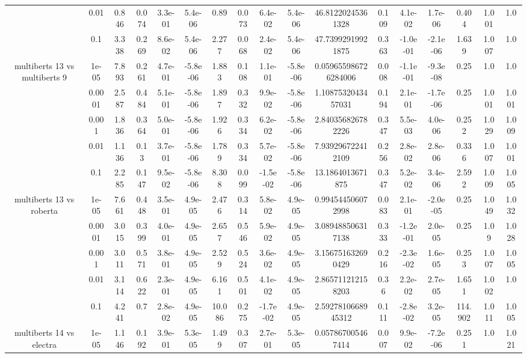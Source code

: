 \begin{tabular}{|c|c|c|c|c|c|c|c|c|c|c|c|c|c|c|c|c|}
 & 0.01 & 0.846 & 0.074 & 3.3e-01 & 5.4e-06 & 0.89 & 0.073 & 6.4e-02 & 5.4e-06 & 46.81220245361328 & 0.109 & 4.1e-02 & 1.7e-06 & 0.404 & 1.001 & 1.0 \\
 & 0.1 & 3.338 & 0.269 & 8.6e-02 & 5.4e-06 & 2.277 & 0.068 & 2.4e-02 & 5.4e-06 & 47.73992919921875 & 0.363 & -1.0e-01 & -2.1e-06 & 1.639 & 1.007 & 1.0 \\
\hline
\multirow{5}{*}{multiberts 13 vs multiberts 9} & 1e-05 & 7.893 & 0.261 & 4.7e-01 & -5.8e-06 & 1.883 & 0.108 & 1.1e-01 & -5.8e-06 & 0.059655986726284006 & 0.008 & -1.1e-01 & -9.3e-08 & 0.25 & 1.0 & 1.0 \\
 & 0.0001 & 2.587 & 0.484 & 5.1e-01 & -5.8e-06 & 1.897 & 0.332 & 9.9e-02 & -5.8e-06 & 1.1087532043457031 & 0.194 & 2.1e-01 & -1.7e-06 & 0.25 & 1.001 & 1.001 \\
 & 0.001 & 1.836 & 0.364 & 5.0e-01 & -5.8e-06 & 1.926 & 0.334 & 6.2e-02 & -5.8e-06 & 2.840356826782226 & 0.347 & 5.5e-03 & 4.0e-06 & 0.252 & 1.029 & 1.009 \\
 & 0.01 & 1.136 & 0.13 & 3.7e-01 & -5.8e-06 & 1.789 & 0.334 & 5.7e-02 & -5.8e-06 & 7.939296722412109 & 0.256 & 2.8e-02 & 2.8e-06 & 0.336 & 1.007 & 1.001 \\
 & 0.1 & 2.285 & 0.147 & 9.5e-02 & -5.8e-06 & 8.308 & 0.099 & -1.5e-02 & -5.8e-06 & 13.1864013671875 & 0.347 & 5.2e-02 & 3.4e-06 & 2.592 & 1.009 & 1.005 \\
\hline
\multirow{5}{*}{multiberts 13 vs roberta } & 1e-05 & 7.661 & 0.448 & 3.5e-01 & 4.9e-05 & 2.476 & 0.314 & 5.8e-02 & 4.9e-05 & 0.994544506072998 & 0.083 & 2.1e-01 & -2.0e-05 & 0.25 & 1.049 & 1.032 \\
 & 0.0001 & 3.015 & 0.399 & 4.0e-01 & 4.9e-05 & 2.657 & 0.546 & 5.9e-02 & 4.9e-05 & 3.089488506317138 & 0.333 & -1.2e-01 & 2.0e-05 & 0.25 & 1.09 & 1.028 \\
 & 0.001 & 3.011 & 0.571 & 3.8e-01 & 4.9e-05 & 2.529 & 0.524 & 3.6e-02 & 4.9e-05 & 3.156751632690429 & 0.216 & -2.3e-02 & 1.6e-05 & 0.253 & 1.007 & 1.005 \\
 & 0.01 & 3.114 & 0.622 & 2.3e-01 & 4.9e-05 & 6.161 & 0.501 & 4.1e-02 & 4.9e-05 & 2.865711212158203 & 0.36 & 2.2e-02 & 2.7e-05 & 1.651 & 1.002 & 1.0 \\
 & 0.1 & 4.241 & 0.7 & 2.8e-02 & 4.9e-05 & 10.086 & 0.275 & -1.7e-02 & 4.9e-05 & 2.5927810668945312 & 0.111 & -2.8e-02 & 3.2e-05 & 114.902 & 1.011 & 1.005 \\
\hline
\multirow{5}{*}{multiberts 14 vs electra } & 1e-05 & 1.146 & 0.192 & 3.9e-01 & 5.3e-05 & 1.499 & 0.307 & 2.7e-01 & 5.3e-05 & 0.057867005467414 & 0.007 & 9.9e-02 & -7.2e-06 & 0.251 & 1.0 & 1.021 \\

\end{tabular}
